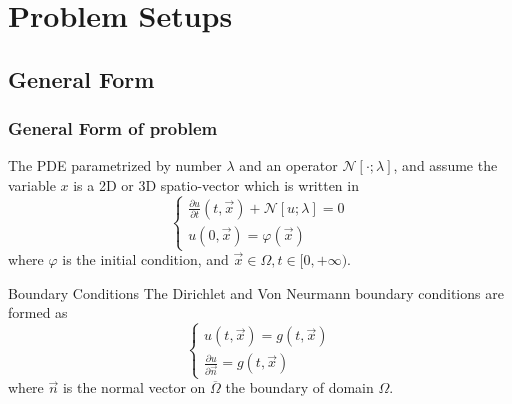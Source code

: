 \section{Problem Setups}

\subsection{General Form}
\begin{frame}
  \frametitle{General Form of problem}
  \begin{block}{}
    The PDE parametrized by number $\lambda$ and an operator $\mathcal{N}[\cdot; \lambda]$, 
    and assume the variable $x$ is a 2D or 3D spatio-vector which is written in 
    \begin{equation}
      \begin{cases}
        \displaystyle \frac{\partial u}{\partial t}\left(t,\vec{x}\right) + \mathcal{N}\left[u;\lambda\right] = 0 \\
        \displaystyle u\left(0,\vec{x}\right) = \varphi (\vec{x})
      \end{cases}
    \end{equation}
    where $\varphi$ is the initial condition, and $\vec{x}\in \Omega, t\in[0, +\infty)$.
  \end{block}


  \begin{block}{Boundary Conditions}
    The Dirichlet and Von Neurmann boundary conditions are formed as 
    \begin{equation}
      \begin{cases}
        \displaystyle u\left(t,\vec{x}\right) = g (t,\vec{x}) \\
        \displaystyle \frac{\partial u}{\partial \vec{n}} = g (t,\vec{x})  
      \end{cases}
    \end{equation}
    where $\vec{n}$ is the normal vector on $\overline{\Omega}$ the boundary of domain $\Omega$.
  \end{block}
\end{frame}



